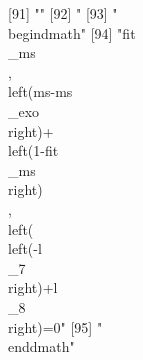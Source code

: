 [91] ""                                                                                                                                                                                                                                                                                                                                                                                                                                                                                            
 [92] "%
 [93] "\\begin{dmath}"                                                                                                                                                                                                                                                                                                                                                                                                                                                                              
 [94] "{{fit\\_ms}}\\, \\left({ms}-{{ms\\_exo}}\\right)+\\left(1-{{fit\\_ms}}\\right)\\, \\left(\\left(-{{l\\_7}}\\right)+{{l\\_8}}\\right)=0"                                                                                                                                                                                                                                                                                                                                                      
 [95] "\\end{dmath}"                                                                                                                                                                                                                                                                                                                                                                                                                                                                                

